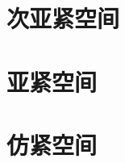 \documentclass[main.tex]{subfiles}
\begin{document}
\section{次亚紧空间}

\section{亚紧空间}

\section{仿紧空间}
	
\end{document}
